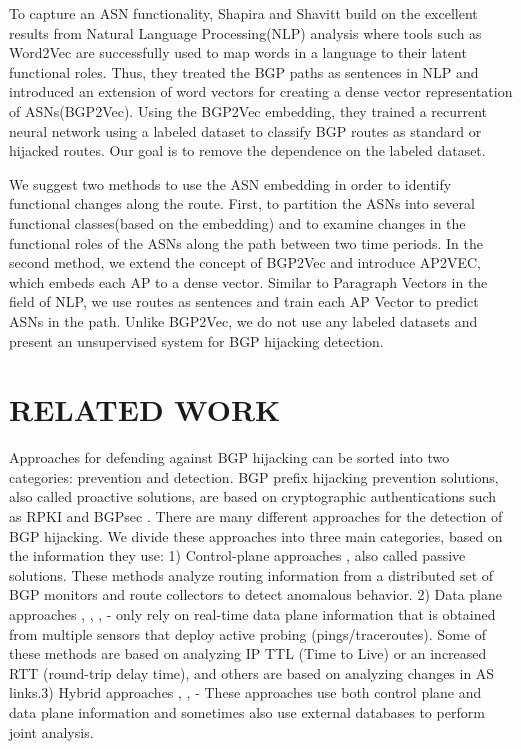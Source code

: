 \documentclass[10pt,journal]{IEEEtran}
\begin{document}
To capture an ASN functionality, Shapira and Shavitt\cite{shapira2020deep} build on the excellent results from Natural Language Processing(NLP) analysis where tools such as Word2Vec\cite{mikolov2013distributed} are successfully used to map words in a language to their latent functional roles. Thus, they treated the BGP paths as sentences in NLP and introduced an extension of word vectors for creating a dense vector representation of ASNs(BGP2Vec). Using the BGP2Vec embedding, they trained a recurrent neural network using a labeled dataset to classify BGP routes as standard or hijacked routes. Our goal is to remove the dependence on the labeled dataset.

We suggest two methods to use the ASN embedding in order to identify functional changes along the route. First, to partition the ASNs into several functional classes(based on the embedding) and to examine changes in the functional roles of the ASNs along the path between two time periods. In the second method, we extend the concept of BGP2Vec and introduce AP2VEC, which embeds each AP to a dense vector. Similar to Paragraph Vectors\cite{le2014distributed} in the field of NLP, we use routes as sentences and train each AP Vector to predict ASNs in the path. Unlike BGP2Vec, we do not use any labeled datasets and present an unsupervised system for BGP hijacking detection.

\section{RELATED WORK}
Approaches for defending against BGP hijacking can be sorted into two categories: prevention and detection. BGP prefix hijacking prevention solutions, also called proactive solutions, are based on cryptographic authentications such as RPKI and BGPsec \cite{huston2011securing, lepinski2017bgpsec, subramanian2004listen, karlin2006pretty}. There are many different approaches for the detection of BGP hijacking. We divide these approaches into three main categories, based on the information they use: 1) Control-plane approaches \cite{sermezis2018artemis}, also called passive solutions. These methods analyze routing information from a distributed set of BGP monitors and route collectors to detect anomalous behavior.
2) Data plane approaches \cite{demchak2018china}, \cite{balu2016darshana}, \cite{hu2007accurate}, \cite{zhang2008ispy} - only rely on real-time data plane information that is obtained from multiple sensors that deploy active probing (pings/traceroutes). Some of these methods are based on analyzing IP TTL (Time to Live) or an increased RTT (round-trip delay time), and others are based on analyzing changes in AS links.3) Hybrid approaches \cite{shi2012detecting}, \cite{schlamp2016heap}, \cite{cheng2016ms} - These approaches use both control plane and data plane information and sometimes also use external databases to perform joint analysis.
\end{document}
